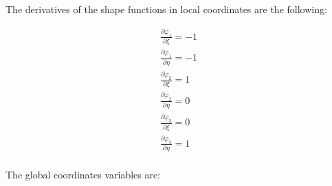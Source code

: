 \documentclass{article}
\begin{document}
The derivatives of the shape functions in local coordinates are the following:

\begin{equation}\label{eq:SF_t}
    \begin{gathered}
        \frac{\partial \varphi_1}{\partial \xi}=-1\\
        \frac{\partial \varphi_1}{\partial \eta}=-1\\
        \frac{\partial \varphi_2}{\partial \xi}=1\\
        \frac{\partial \varphi_2}{\partial \eta}=0\\
        \frac{\partial \varphi_3}{\partial \xi}=0\\
        \frac{\partial \varphi_3}{\partial \eta}=1\\
    \end{gathered}
\end{equation}

The global coordinates variables are:
\end{document}
